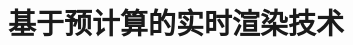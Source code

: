 \begin{comment}
\chapter{基于预计算的实时渲染技术}\label{chp:prt}\minitoc


\chapter{基于体素的全局光照技术}\label{chp:vct}\minitoc


\chapter{基于距离场的全局光照技术}\label{chp:df}\minitoc



\end{comment}


\setcounter{chapter}{11}
\chapter{基于预计算的实时渲染技术}\label{chp:prt}\minitoc



\begin{comment}


















\end{comment}



